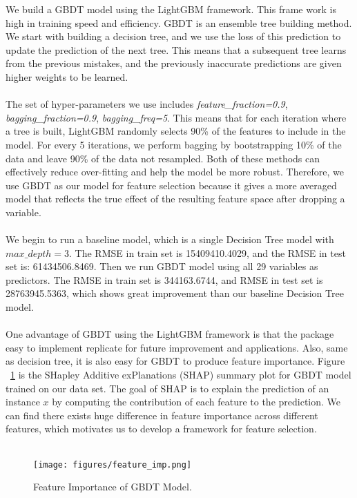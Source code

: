 \documentclass{article}
\begin{document}
We build a GBDT model using the LightGBM framework\cite{model}. This frame work is high in training speed and efficiency. GBDT is an ensemble tree building method. We start with building a decision tree, and we use the loss of this prediction to update the prediction of the next tree. This means that a subsequent tree learns from the previous mistakes, and the previously inaccurate predictions are given higher weights to be learned.\\
\\
The set of hyper-parameters we use includes \textit{feature\_fraction=0.9}, \textit{bagging\_fraction=0.9}, \textit{bagging\_freq=5}. This means that for each iteration where a tree is built, LightGBM randomly selects 90\% of the features to include in the model. For every 5 iterations, we perform bagging by bootstrapping 10\% of the data and leave 90\% of the data not resampled. Both of these methods can effectively reduce over-fitting and help the model be more robust. Therefore, we use GBDT as our model for feature selection because it gives a more averaged model that reflects the true effect of the resulting feature space after dropping a variable.\\
\\
We begin to run a baseline model, which is a single Decision Tree model with $max\_depth = 3$. The RMSE in train set is 15409410.4029, and the RMSE in test set is: 61434506.8469. Then we run GBDT model using all 29 variables as predictors. The RMSE in train set is 344163.6744, and RMSE in test set is 28763945.5363, which shows great improvement than our baseline Decision Tree model.\\
\\
One advantage of GBDT using the LightGBM framework is that the package easy to implement replicate for future improvement and applications. Also, same as decision tree, it is also easy for GBDT to produce feature importance. Figure ~\ref{fig:shap summary} is the SHapley Additive exPlanations (SHAP) summary plot for GBDT model trained on our data set. The goal of SHAP is to explain the prediction of an instance $x$ by computing the contribution of each feature to the prediction\cite{shap}. We can find there exists huge difference in feature importance across different features, which motivates us to develop a framework for feature selection. \\
\\

\begin{figure}[H]
    \centering
    \texttt{[image: figures/feature\_imp.png]}%
    \caption{Feature Importance of GBDT Model.}
    \label{fig:shap summary}
\end{figure}
\end{document}
